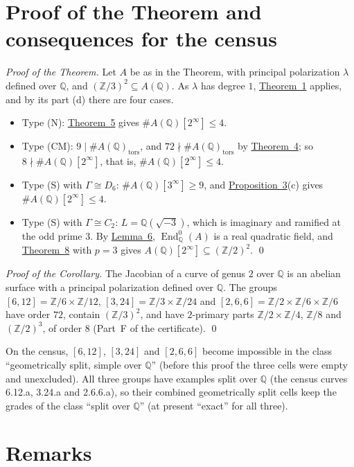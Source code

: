\documentclass[11pt]{article}
\newcommand{\Q}{\mathbb Q}
\newcommand{\Z}{\mathbb Z}
\DeclareMathOperator{\End}{End}
\begin{document}
\section{Proof of the Theorem and consequences for the census}\label{proof}

\emph{Proof of the Theorem.} Let \(A\) be as in the Theorem, with principal polarization \(\lambda\) defined over
\(\Q\), and \((\Z/3)^2\subseteq A(\Q)\). As \(\lambda\) has degree \(1\), \hyperref[thm-full3]{Theorem~1} applies,
and by its part (d) there are four cases.
\begin{itemize}
\item Type (N): \hyperref[thm-N]{Theorem~5} gives \(\#A(\Q)[2^\infty]\le4\).
\item Type (CM): \(9\mid\#A(\Q)_{\mathrm{tors}}\), and \(72\nmid\#A(\Q)_{\mathrm{tors}}\) by
\hyperref[thm-cm]{Theorem~4}; so \(8\nmid\#A(\Q)[2^\infty]\), that is, \(\#A(\Q)[2^\infty]\le4\).
\item Type (S) with \(\Gamma\cong D_6\): \(\#A(\Q)[3^\infty]\ge9\), and \hyperref[prop-ord3]{Proposition~3}(c)
gives \(\#A(\Q)[2^\infty]\le4\).
\item Type (S) with \(\Gamma\cong C_2\): \(L=\Q(\sqrt{-3})\), which is imaginary and ramified at the odd prime
\(3\). By \hyperref[lemma-rm]{Lemma~6}, \(\End^0_{\Q}(A)\) is a real quadratic field, and
\hyperref[thm-inertia]{Theorem~8} with \(p=3\) gives \(A(\Q)[2^\infty]\subseteq(\Z/2)^2\). \qed
\end{itemize}

\medskip
\emph{Proof of the Corollary.} The Jacobian of a curve of genus \(2\) over \(\Q\) is an abelian surface with a
principal polarization defined over \(\Q\). The groups \([6,12]=\Z/6\times\Z/12\), \([3,24]=\Z/3\times\Z/24\) and
\([2,6,6]=\Z/2\times\Z/6\times\Z/6\) have order \(72\), contain \((\Z/3)^2\), and have \(2\)-primary parts
\(\Z/2\times\Z/4\), \(\Z/8\) and \((\Z/2)^3\), of order \(8\) (Part~F of the certificate). \qed

\medskip
On the census, \([6,12]\), \([3,24]\) and \([2,6,6]\) become impossible in the class ``geometrically split, simple
over \(\Q\)'' (before this proof the three cells were empty and unexcluded). All three groups have examples split
over \(\Q\) (the census curves 6.12.a, 3.24.a and 2.6.6.a), so their combined geometrically split cells keep the
grades of the class ``split over \(\Q\)'' (at present ``exact'' for all three).

\section{Remarks}\label{remarks}
\end{document}
